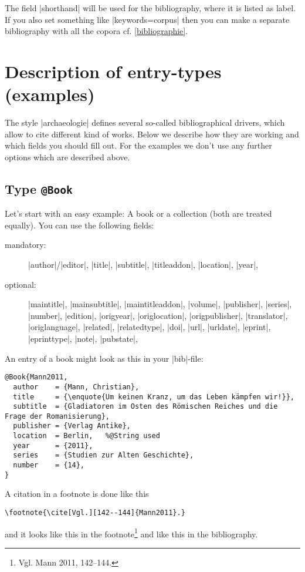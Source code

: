 \documentclass[a4paper,
10pt,
greek,
french,
spanish,
italian,
ngerman,
english
]{ltxdoc}
\begin{document}
The field |shorthand| will be used for the bibliography,
where it is listed as label.
If you also set something like  |keywords={corpus}| then you can make a separate bibliography with all the copora cf. \cref{bibliographie}.



 \section{Description of  entry-types (examples)} \label{beispiele}
 The style |archaeologie| defines several so-called bibliographical drivers,
which allow to cite different kind of works.
Below we describe how they are working and which fields you should fill out.
For the examples we don’t use any further options which are described above.


 \subsection{Type \texttt{@Book}}\label{book}
Let’s start with an easy example: A book or a collection (both are treated equally).
You can use the following fields:
\begin{description}
\item[mandatory:] 
|author|/|editor|, 
|title|, |subtitle|, |titleaddon|,
|location|, |year|,
\item[optional:]
|maintitle|, |mainsubtitle|, |maintitleaddon|, |volume|, 
|publisher|, |series|, |number|, |edition|, 
|origyear|, |origlocation|, |origpublisher|, 
|translator|, |origlanguage|,
|related|, |relatedtype|,
|doi|, |url|, |urldate|, |eprint|, |eprinttype|, |note|, |pubstate|, 
 \end{description}
 
 
An entry of a book might look as this in your |bib|-file:
\begin{lstlisting}[style=bibentry,label=Mann2011,caption={{@}Book\{Mann2011,…\} }]
@Book{Mann2011,
  author    = {Mann, Christian},
  title     = {\enquote{Um keinen Kranz, um das Leben kämpfen wir!}},
  subtitle  = {Gladiatoren im Osten des Römischen Reiches und die Frage der Romanisierung},
  publisher = {Verlag Antike},
  location  = Berlin, 	%@String used
  year      = {2011},
  series    = {Studien zur Alten Geschichte},
  number    = {14},
}
\end{lstlisting}
A citation in a footnote is done like this
\begin{lstlisting}
\footnote{\cite[Vgl.][142--144]{Mann2011}.}
\end{lstlisting} 
and it looks like this in the footnote\footnote{Vgl. Mann 2011, 142--144.}
and like this in the bibliography.
\end{document}
